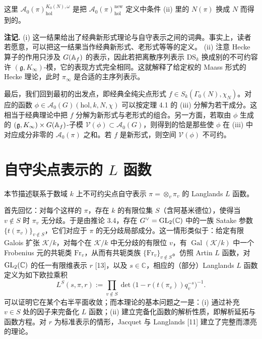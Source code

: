 \medskip
这里 $\mathcal{A}_0(\pi)^{K_0(N),\omega}_{\mathrm{hol}}$ 是把 $\mathcal{A}_0(\pi)^{\mathrm{new}}_{\mathrm{hol}}$ 定义中条件 (ii) 里的 $N(\pi)$ 换成 $N$ 而得到的。

\medskip\noindent\textbf{注记.}\quad
(i) 这一结果给出了经典新形式理论与自守表示之间的词典。事实上，读者若愿意，可以把这一结果当作经典新形式、老形式等等的定义。
(ii) 注意 Hecke 算子的作用只涉及 $G(\mathbb{A}_f)$ 的表示，因此若把离散序列表示 $\mathrm{DS}_k$ 换成别的不可约容许 $(\mathfrak{g},K_\infty)$-模，它的表现方式完全相同。这就解释了给定权的 Maass 形式的 Hecke 理论，此时 $\pi_\infty$ 是合适的主序列表示。

最后，我们回到最初的出发点，即经典全纯尖点形式 $f\in S_k(\Gamma_0(N),\chi_N)$。对应的函数 $\phi\in\mathcal{A}_0(G)(\mathrm{hol},k,N,\chi)$ 可以按定理 4.1 的 (iii) 分解为若干成分。这相当于经典理论中把 $f$ 分解为新形式与老形式的组合。另一方面，若取由 $\phi$ 生成的 $(\mathfrak{g},K_\infty)\times G(\mathbb{A}_f)$-子模 $\mathcal{V}(\phi)\subset\mathcal{A}_0(G)$，则得到的恰是那些使 $\phi$ 在 (iii) 中对应成分非零的 $\mathcal{A}_0(\pi)$ 之和。若 $f$ 是新形式，则空间 $\mathcal{V}(\phi)$ 不可约。

\section{自守尖点表示的 $L$ 函数}

本节描述联系于数域 $k$ 上不可约尖点自守表示 $\pi=\otimes_v\pi_v$ 的 Langlands $L$ 函数。

首先回忆：对每个这样的 $\pi$，存在 $k$ 的有限位集 $S$（含阿基米德位），使得当 $v\notin S$ 时 $\pi_v$ 无分歧。于是由推论 3.4，存在 $G^\vee=\mathrm{GL}_2(\mathbb{C})$ 中的一族 Satake 参数 $\{t(\pi_v)\}_{v\notin S}$，它们对应于 $\pi$ 的无分歧局部成分。这一情形类似于：给定有限 Galois 扩张 $\mathcal{K}/k$，对每个在 $\mathcal{K}/k$ 中无分歧的有限位 $v$，有 $\operatorname{Gal}(\mathcal{K}/k)$ 中一个 Frobenius 元的共轭类 $\mathrm{Fr}_v$，从而有共轭类族 $\{\mathrm{Fr}_v\}_{v\notin S}$。仿照 Artin $L$ 函数，对 $\mathrm{GL}_2(\mathbb{C})$ 的任一有限维表示 $r$ [13]，以及 $s\in\mathbb{C}$，相应的（部分）Langlands $L$ 函数定义为如下欧拉乘积
\[
L^S(s,\pi,r):=\prod_{v\notin S}\det\bigl(1-r(t(\pi_v))q_v^{-s}\bigr)^{-1}.
\]
可以证明它在某个右半平面收敛；而本理论的基本问题之一是：(i) 通过补充 $v\in S$ 处的因子来完备化 $L$ 函数；(ii) 建立完备化函数的解析性质，即解析延拓与函数方程。对 $r$ 为标准表示的情形，Jacquet 与 Langlands [11] 建立了完整而漂亮的理论。

